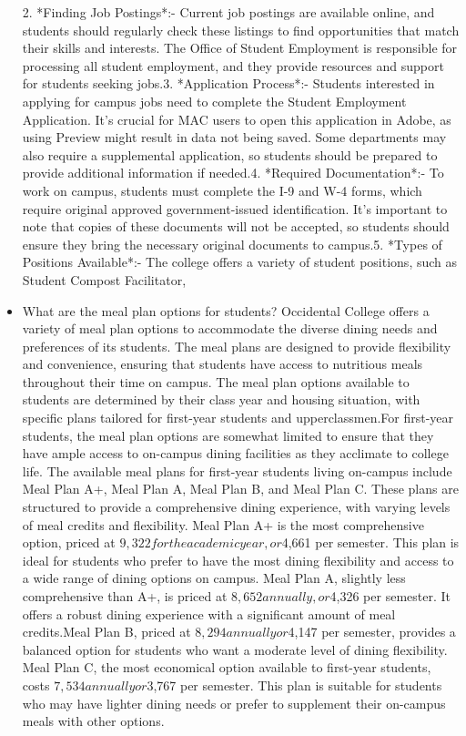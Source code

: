 \documentclass[10pt,twocolumn]{article}
\begin{document}
\begin{itemize}
2. *Finding Job Postings*:- Current job postings are available online, and students should regularly check these listings to find opportunities that match their skills and interests. The Office of Student Employment is responsible for processing all student employment, and they provide resources and support for students seeking jobs.3. *Application Process*:- Students interested in applying for campus jobs need to complete the Student Employment Application. It’s crucial for MAC users to open this application in Adobe, as using Preview might result in data not being saved. Some departments may also require a supplemental application, so students should be prepared to provide additional information if needed.4. *Required Documentation*:- To work on campus, students must complete the I-9 and W-4 forms, which require original approved government-issued identification. It’s important to note that copies of these documents will not be accepted, so students should ensure they bring the necessary original documents to campus.5. *Types of Positions Available*:- The college offers a variety of student positions, such as Student Compost Facilitator,
\newline
\item What are the meal plan options for students?
Occidental College offers a variety of meal plan options to accommodate the diverse dining needs and preferences of its students. The meal plans are designed to provide flexibility and convenience, ensuring that students have access to nutritious meals throughout their time on campus. The meal plan options available to students are determined by their class year and housing situation, with specific plans tailored for first-year students and upperclassmen.For first-year students, the meal plan options are somewhat limited to ensure that they have ample access to on-campus dining facilities as they acclimate to college life. The available meal plans for first-year students living on-campus include Meal Plan A+, Meal Plan A, Meal Plan B, and Meal Plan C. These plans are structured to provide a comprehensive dining experience, with varying levels of meal credits and flexibility.
Meal Plan A+ is the most comprehensive option, priced at $9,322 for the academic year, or $4,661 per semester. This plan is ideal for students who prefer to have the most dining flexibility and access to a wide range of dining options on campus. Meal Plan A, slightly less comprehensive than A+, is priced at $8,652 annually, or $4,326 per semester. It offers a robust dining experience with a significant amount of meal credits.Meal Plan B, priced at $8,294 annually or $4,147 per semester, provides a balanced option for students who want a moderate level of dining flexibility. Meal Plan C, the most economical option available to first-year students, costs $7,534 annually or $3,767 per semester. This plan is suitable for students who may have lighter dining needs or prefer to supplement their on-campus meals with other options.

\end{itemize}
\end{document}
